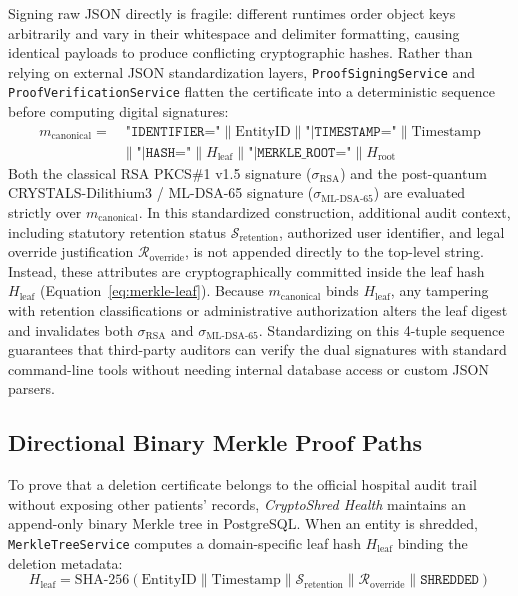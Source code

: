 Signing raw JSON directly is fragile: different runtimes order object keys arbitrarily and vary in their whitespace and delimiter formatting, causing identical payloads to produce conflicting cryptographic hashes. Rather than relying on external JSON standardization layers, \texttt{ProofSigningService} and \texttt{ProofVerificationService} flatten the certificate into a deterministic sequence before computing digital signatures:
\begin{equation}
\begin{split}
    m_{\text{canonical}} = &\; \texttt{"IDENTIFIER="} \parallel \text{EntityID} \parallel \texttt{"|TIMESTAMP="} \parallel \text{Timestamp} \\
    &\parallel \texttt{"|HASH="} \parallel H_{\text{leaf}} \parallel \texttt{"|MERKLE\_ROOT="} \parallel H_{\text{root}}
\end{split}
\label{eq:canonical-payload}
\end{equation}
Both the classical RSA PKCS\#1 v1.5 signature ($\sigma_{\text{RSA}}$) and the post-quantum CRYSTALS-Dilithium3 / ML-DSA-65 signature ($\sigma_{\text{ML-DSA-65}}$) are evaluated strictly over $m_{\text{canonical}}$. In this standardized construction, additional audit context, including statutory retention status $\mathcal{S}_{\text{retention}}$, authorized user identifier, and legal override justification $\mathcal{R}_{\text{override}}$, is not appended directly to the top-level string. Instead, these attributes are cryptographically committed inside the leaf hash $H_{\text{leaf}}$ (Equation~\ref{eq:merkle-leaf}). Because $m_{\text{canonical}}$ binds $H_{\text{leaf}}$, any tampering with retention classifications or administrative authorization alters the leaf digest and invalidates both $\sigma_{\text{RSA}}$ and $\sigma_{\text{ML-DSA-65}}$. Standardizing on this 4-tuple sequence guarantees that third-party auditors can verify the dual signatures with standard command-line tools without needing internal database access or custom JSON parsers.
\subsection{Directional Binary Merkle Proof Paths}

To prove that a deletion certificate belongs to the official hospital audit trail without exposing other patients' records, \textit{CryptoShred Health} maintains an append-only binary Merkle tree in PostgreSQL. When an entity is shredded, \texttt{MerkleTreeService} computes a domain-specific leaf hash $H_{\text{leaf}}$ binding the deletion metadata:
\begin{equation}
    H_{\text{leaf}} = \text{SHA-256}(\text{EntityID} \parallel \text{Timestamp} \parallel \mathcal{S}_{\text{retention}} \parallel \mathcal{R}_{\text{override}} \parallel \texttt{SHREDDED})
    \label{eq:merkle-leaf}
\end{equation}

